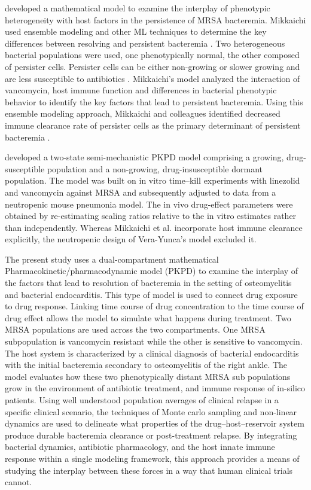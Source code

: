 \documentclass[utf8]{FrontiersinHarvard} %
\begin{document}
\citet{Mikkaichi2019} developed a mathematical model to examine the interplay of phenotypic heterogeneity
with host factors in the persistence of MRSA bacteremia.  Mikkaichi used ensemble modeling and other ML techniques to determine
the key differences between resolving and persistent bacteremia \citep{Mikkaichi2019}.
Two heterogeneous bacterial populations were used, one phenotypically normal, the other composed of persister cells.
Persister cells can be either non-growing or slower growing and are less susceptible to antibiotics \citep{Mikkaichi2019}.
Mikkaichi's model analyzed the interaction of vancomycin, host immune function and differences in bacterial phenotypic behavior to identify the key factors that lead to persistent bacteremia.  Using this ensemble modeling approach, Mikkaichi and colleagues identified decreased immune clearance rate of persister cells as the primary determinant of persistent bacteremia \citep{Mikkaichi2019}.

\citet{VeraYunca2025} developed a two-state semi-mechanistic PKPD model comprising a growing,
drug-susceptible population and a non-growing, drug-insusceptible dormant population. The model was built on in vitro time--kill
experiments with linezolid and vancomycin against MRSA and subsequently adjusted to data from a neutropenic mouse pneumonia model.
The in vivo drug-effect parameters were obtained by re-estimating scaling
ratios relative to the in vitro estimates rather than independently.
Whereas Mikkaichi et al. incorporate host immune clearance explicitly, the neutropenic design of Vera-Yunca's model excluded it.

The present study uses a dual-compartment mathematical Pharmacokinetic/pharmacodynamic model (PKPD)
to examine the interplay of the factors that lead to resolution of bacteremia in the setting of osteomyelitis and bacterial endocarditis.
This type of model is used to connect drug exposure to drug response.
Linking time course of drug concentration to the time course of drug effect allows the model to simulate what happens during treatment.
Two MRSA populations are used across the two compartments.  One MRSA subpopulation is vancomycin resistant
while the other is sensitive to vancomycin.  The host system is characterized by a clinical diagnosis of bacterial
endocarditis with the initial bacteremia secondary to osteomyelitis of the right ankle.
The model evaluates how these two phenotypically distant MRSA sub populations grow in the environment of antibiotic treatment,
and immune response of in-silico patients. Using well understood population averages of clinical relapse in a specific clinical scenario, the techniques of Monte carlo sampling and non-linear dynamics are used to delineate what properties of the drug--host--reservoir system produce durable bacteremia clearance or post-treatment relapse. By integrating bacterial dynamics, antibiotic pharmacology, and the host innate immune response within a single modeling framework, this approach provides a means of studying the interplay between these forces in a way that human clinical trials cannot.
\end{document}
